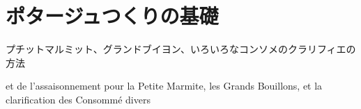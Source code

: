 \href{原稿下準備20180414五島、連載からコピー}{} \href{訳と注釈}{}
\href{未、原文対照チェック}{} \href{未、日本語表現校正}{}
\href{未、その他修正}{} \href{未、原稿最終校正}{}

\hypertarget{ux30ddux30bfux30fcux30b8ux30e5ux3064ux304fux308aux306eux57faux790e}{%
\section{ポタージュつくりの基礎}\label{ux30ddux30bfux30fcux30b8ux30e5ux3064ux304fux308aux306eux57faux790e}}

\begin{center}
プチットマルミット、グランドブイヨン、いろいろなコンソメのクラリフィエの方法
\end{center}


\begin{center}

et de l'assaisonnement pour la Petite Marmite, les Grands Bouillons,
et la clarification des Consommé divers

\end{center}

